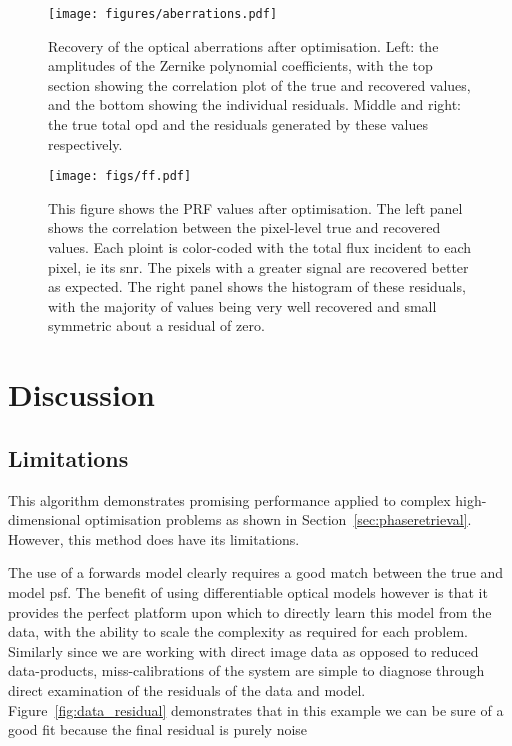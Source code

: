 \documentclass[]{spieman}
\begin{document}
\begin{figure*}
    \centering
    \texttt{[image: figures/aberrations.pdf]}
    \caption{Recovery of the optical aberrations after optimisation. Left: the amplitudes of the Zernike polynomial coefficients, with the top section showing the correlation plot of the true and recovered values, and the bottom showing the individual residuals. Middle and right: the true total \ac{opd} and the residuals generated by these values respectively.}
    \label{fig:aberrations}
\end{figure*}

\begin{figure*}
    \centering
    \texttt{[image: figs/ff.pdf]}
    \caption{This figure shows the PRF values after optimisation. The left panel shows the correlation between the pixel-level true and recovered values. Each ploint is color-coded with the total flux incident to each pixel, ie its \ac{snr}. The pixels with a greater signal are recovered better as expected. The right panel shows the histogram of these residuals, with the majority of values being very well recovered and small symmetric about a residual of zero.}
    \label{fig:flat_field}
\end{figure*}

\section{Discussion}

\subsection{Limitations}
This algorithm demonstrates promising performance applied to complex high-dimensional optimisation problems as shown in Section~\ref{sec:phaseretrieval}. However, this method does have its limitations.

The use of a forwards model clearly requires a good match between the true and model \ac{psf}. The benefit of using differentiable optical models however is that it provides the perfect platform upon which to directly learn this model from the data, with the ability to scale the complexity as required for each problem. Similarly since we are working with direct image data as opposed to reduced data-products, miss-calibrations of the system are simple to diagnose through direct examination of the residuals of the data and model. Figure~\ref{fig:data_residual} demonstrates that in this example we can be sure of a good fit because the final residual is purely noise
\end{document}
